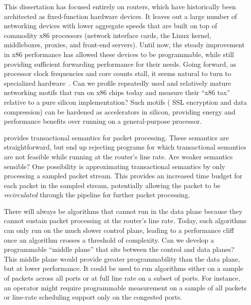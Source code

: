  This dissertation has focused entirely on
routers, which have historically been architected as fixed-function hardware
devices. It leaves out a large number of networking devices with lower
aggregate speeds that are built on top of commodity x86 processors (\eg network
interface cards, the Linux kernel, middleboxes, proxies, and front-end
servers). Until now, the steady improvement in x86 performance has allowed
these devices to be programmable, while still providing sufficient forwarding
performance for their needs. Going forward, as processor clock frequencies and
core counts stall, it seems natural to turn to specialized
hardware~\cite{dark_silicon, four_horsemen}. Can we profile repeatedly used and
relatively mature networking motifs that run on x86 chips today and measure
their ``x86 tax'' relative to a pure silicon implementation? Such motifs (\eg
SSL encryption and data compression) can be hardened as accelerators in
silicon, providing energy and performance benefits over running on a
general-purpose processor.

 \pktlanguage provides
transactional semantics for packet processing. These semantics are
straightforward, but end up rejecting programs for which transactional
semantics are not feasible while running at the router's line rate.  Are weaker
semantics sensible? One possibility is approximating transactional semantics by
only processing a sampled packet stream.  This provides an increased time
budget for each packet in the sampled stream, potentially allowing the packet
to be {\em recirculated} through the pipeline for further packet processing.

 There will always be algorithms that
cannot run in the data plane because they cannot sustain packet processing at
the router's line rate. Today, such algorithms can only run on the much slower
control plane, leading to a performance cliff once an algorithm crosses a
threshold of complexity. Can we develop a programmable ``middle plane'' that
sits between the control and data planes? This middle plane would provide
greater programmability than the data plane, but at lower performance. It could
be used to run algorithms either on a sample of packets across all ports or at
full line rate on a subset of ports. For instance, an operator might require
programmable measurement on a sample of all packets or line-rate scheduling
support only on the congested ports.


